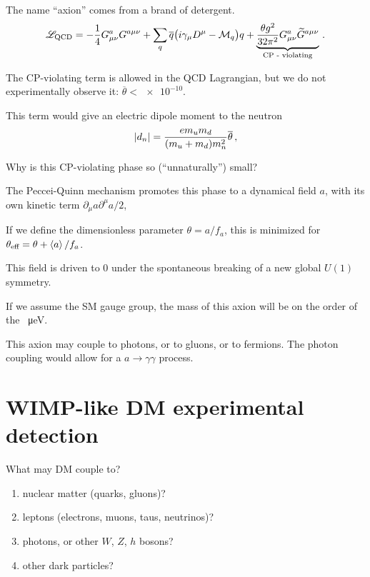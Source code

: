 \documentclass[main.tex]{subfiles}
\begin{document}

The name ``axion'' comes from a brand of detergent. 
%
\begin{align}
\mathscr{L} _{\text{QCD}}
= - \frac{1}{4} G^{a}_{\mu \nu }
G^{a \mu \nu }
+ \sum _{q} 
\overline{q} \qty(i \gamma_{\mu } D^{\mu } - \mathcal{M}_q) q 
+
\underbrace{\frac{\theta g^2}{32 \pi^2} G^{a}_{\mu \nu }
\widetilde{G}^{a \mu \nu }}_{\text{CP - violating}}
\,.
\end{align}

The CP-violating term is allowed in the QCD Lagrangian, but we do not experimentally observe it: \(\overline{\theta} < \num{e-10}\). 

This term would give an electric dipole moment to the neutron 
%
\begin{align}
\abs{d_n} = \frac{e m_u m_d}{(m_u + m_d) m_n^2} \overline{\theta}
\,,
\end{align}
%

Why is this CP-violating phase so (``unnaturally'') small? 

The Peccei-Quinn mechanism promotes this phase to a dynamical field \(a\), with its own kinetic term \(\partial_{\mu } a \partial^{\mu } a  / 2\), 

If we define the dimensionless parameter \(\theta = a / f_a\), this is minimized for \(\theta _{\text{eff}} = \theta + \expval{a} / f_a\).

This field is driven to 0 under the spontaneous breaking of a new global \(U(1)\) symmetry.

If we assume the SM gauge group, the mass of this axion will be on the order of the \SI{}{\micro eV}. 

This axion may couple to photons, or to gluons, or to fermions. 
The photon coupling would allow for a \(a \to \gamma \gamma \) process.

\section{WIMP-like DM experimental detection}

What may DM couple to? 
\begin{enumerate}
    \item nuclear matter (quarks, gluons)?
    \item leptons (electrons, muons, taus, neutrinos)?
    \item photons, or other \(W\), \(Z\), \(h\) bosons?
    \item other dark particles?
\end{enumerate}
\end{document}
